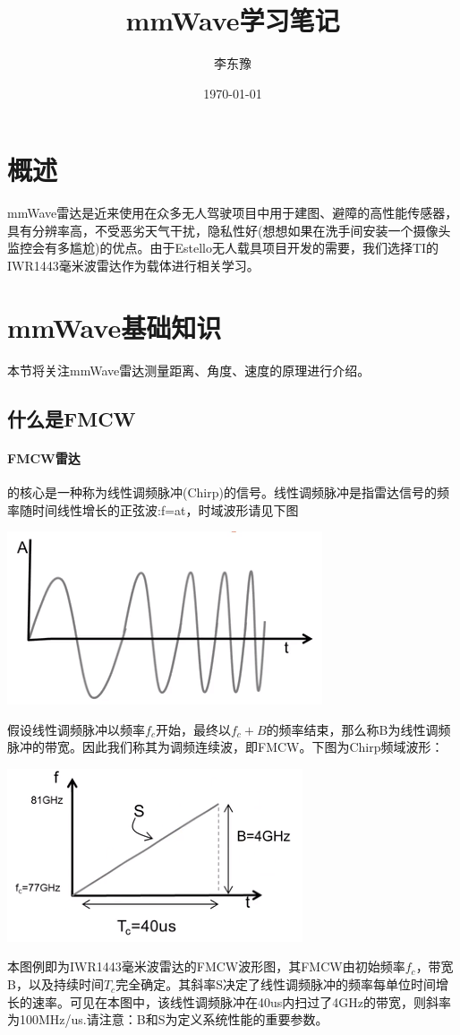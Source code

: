 \documentclass[UTF8]{ctexart}
\title{mmWave学习笔记}
\author{李东豫}
\date{\today}
\begin{document}
\maketitle
\tableofcontents
\section{概述}
mmWave雷达是近来使用在众多无人驾驶项目中用于建图、避障的高性能传感器，具有分辨率高，不受恶劣天气干扰，隐私性好(想想如果在洗手间安装一个摄像头监控会有多尴尬)的优点。由于Estello无人载具项目开发的需要，我们选择TI的IWR1443毫米波雷达作为载体进行相关学习。
\section{mmWave基础知识}
本节将关注mmWave雷达测量距离、角度、速度的原理进行介绍。
\subsection{什么是FMCW}
\paragraph{FMCW雷达}
的核心是一种称为线性调频脉冲(Chirp)的信号。线性调频脉冲是指雷达信号的频率随时间线性增长的正弦波:f=at，时域波形请见下图\\
{\centering \includegraphics[width = .4\textwidth]{pic/FMCW.png}

}

假设线性调频脉冲以频率$f_c$开始，最终以$f_c+B$的频率结束，那么称B为线性调频脉冲的带宽。因此我们称其为调频连续波，即FMCW。下图为Chirp频域波形：

{\centering \includegraphics[width = .4\textwidth]{pic/FMCW_Fwave.png}

}

本图例即为IWR1443毫米波雷达的FMCW波形图，其FMCW由初始频率$f_c$，带宽B，以及持续时间$T_c$完全确定。其斜率S决定了线性调频脉冲的频率每单位时间增长的速率。可见在本图中，该线性调频脉冲在40us内扫过了4GHz的带宽，则斜率为100MHz/us.请注意：B和S为定义系统性能的重要参数。
\end{document}
